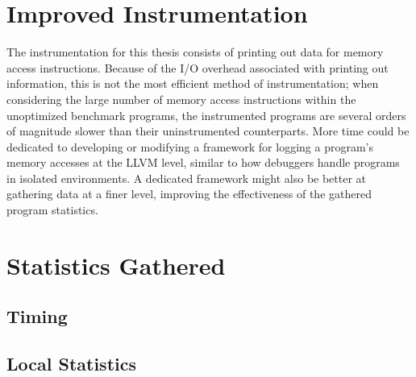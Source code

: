 \section{Improved Instrumentation}
The instrumentation for this thesis consists of printing out data for memory access instructions. Because of the I/O overhead associated with printing out information, this is not the most efficient method of instrumentation; when considering the large number of memory access instructions within the unoptimized benchmark programs, the instrumented programs are several orders of magnitude slower than their uninstrumented counterparts. More time could be dedicated to developing or modifying a framework for logging a program's memory accesses at the LLVM level, similar to how debuggers handle programs in isolated environments. A dedicated framework might also be better at gathering data at a finer level, improving the effectiveness of the gathered program statistics.

\section{Statistics Gathered}

\subsection{Timing}

\subsection{Local Statistics}
